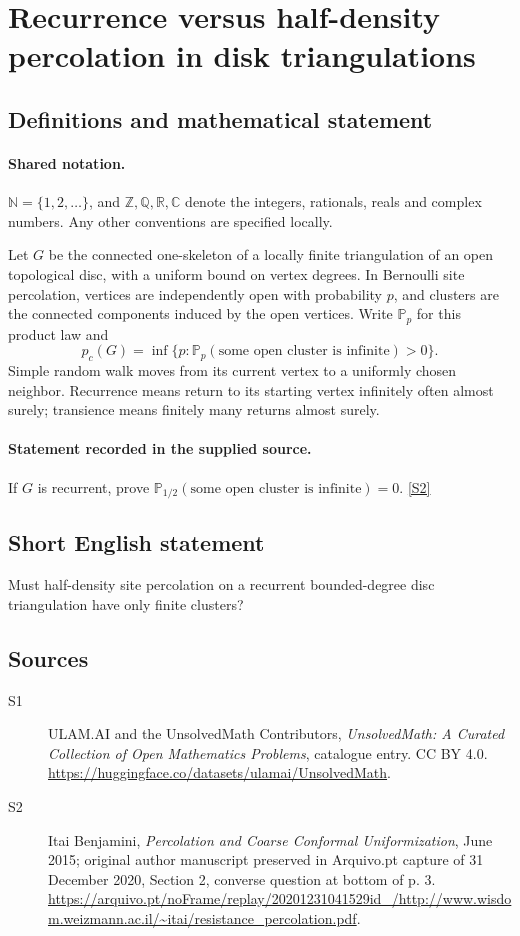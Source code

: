 \documentclass[11pt]{article}
\newcommand{\sref}[2]{\hyperlink{source:#1:#2}{[S#2]}}
\begin{document}
\section{Recurrence versus half-density percolation in disk triangulations}\label{statement}

\subsection{Definitions and mathematical statement}

\paragraph{Shared notation.}$\mathbb N=\{1,2,\ldots\}$, and $\mathbb Z,\mathbb Q,\mathbb R,\mathbb C$ denote the integers, rationals, reals and complex numbers. Any other conventions are specified locally.


Let $G$ be the connected one-skeleton of a locally finite triangulation of an open topological disc, with a uniform bound on vertex degrees. In Bernoulli site percolation, vertices are independently open with probability $p$, and clusters are the connected components induced by the open vertices. Write $\mathbb P_p$ for this product law and
\[p_c(G)=\inf\{p:\mathbb P_p(\text{some open cluster is infinite})>0\}.\]
Simple random walk moves from its current vertex to a uniformly chosen neighbor. Recurrence means return to its starting vertex infinitely often almost surely; transience means finitely many returns almost surely.
\paragraph{Statement recorded in the supplied source.}
If $G$ is recurrent, prove $\mathbb P_{1/2}(\text{some open cluster is infinite})=0$. \sref{statement}{2}
\subsection{Short English statement}
Must half-density site percolation on a recurrent bounded-degree disc triangulation have only finite clusters?
\subsection{Sources}
\begin{description}
\item[\hypertarget{source:statement:1}{S1}] ULAM.AI and the UnsolvedMath Contributors, \emph{UnsolvedMath: A Curated Collection of Open Mathematics Problems}, catalogue entry. CC BY 4.0. \url{https://huggingface.co/datasets/ulamai/UnsolvedMath}.
\item[\hypertarget{source:statement:2}{S2}] Itai Benjamini, \emph{Percolation and Coarse Conformal Uniformization}, June 2015; original author manuscript preserved in Arquivo.pt capture of 31 December 2020, Section 2, converse question at bottom of p. 3. \url{https://arquivo.pt/noFrame/replay/20201231041529id_/http://www.wisdom.weizmann.ac.il/~itai/resistance_percolation.pdf}.
\end{description}
\label{end:statement}
\end{document}

